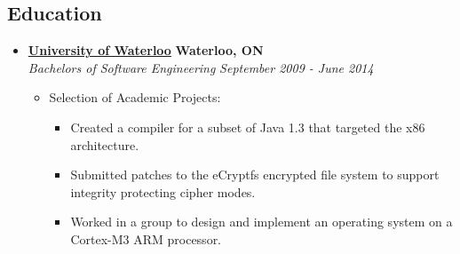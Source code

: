 \documentclass[10pt,letterpaper]{article}
\begin{document}
\subsection*{Education}
  \begin{itemize}
    \parskip=-0.1em

    \item[]
    {\href{http://www.uwaterloo.ca}{\textbf{University of Waterloo}} \hfill
      \textbf{Waterloo, ON}}
    \\
    {\emph{Bachelors of Software Engineering} \hfill
      \emph{September 2009 - June 2014}}

    \begin{itemize}[label=\textbullet]
      \item Selection of Academic Projects:
      \begin{itemize}
        \itemsep0em
        \item Created a compiler for a subset of Java 1.3 that targeted the x86 architecture.
        \item Submitted patches to the eCryptfs encrypted file system to support
          integrity protecting cipher modes.
        \item Worked in a group to design and implement an operating system on
          a Cortex-M3 ARM processor.
      \end{itemize}
    \end{itemize}
  \end{itemize}
\end{document}
